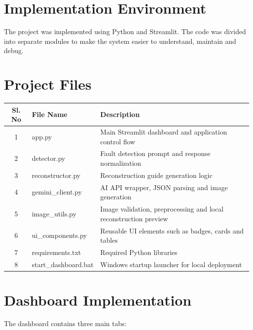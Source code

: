 \documentclass[12pt,a4paper]{report}
\begin{document}
\section{Implementation Environment}

The project was implemented using Python and Streamlit. The code was divided into separate modules to make the system easier to understand, maintain and debug.

\section{Project Files}

\begin{longtable}{|c|p{5cm}|p{6cm}|}

\hline
\textbf{Sl. No} & \textbf{File Name} & \textbf{Description} \\
\hline

1 & app.py & Main Streamlit dashboard and application control flow \\
\hline

2 & detector.py & Fault detection prompt and response normalization \\
\hline

3 & reconstructor.py & Reconstruction guide generation logic \\
\hline

4 & gemini\_client.py & AI API wrapper, JSON parsing and image generation \\
\hline

5 & image\_utils.py & Image validation, preprocessing and local reconstruction preview \\
\hline

6 & ui\_components.py & Reusable UI elements such as badges, cards and tables \\
\hline

7 & requirements.txt & Required Python libraries \\
\hline

8 & start\_dashboard.bat & Windows startup launcher for local deployment \\
\hline

\end{longtable}

\section{Dashboard Implementation}

The dashboard contains three main tabs:
\end{document}
